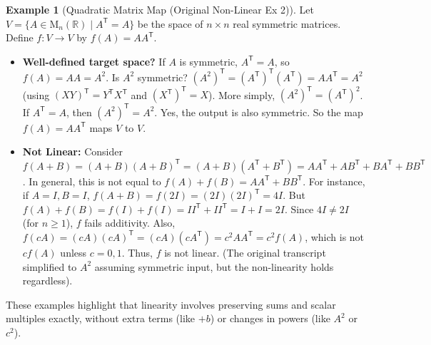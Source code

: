 \documentclass[11pt]{article}
\theoremstyle{definition}
\newtheorem{example}[theorem]{Example}
\theoremstyle{remark}
\newcommand{\R}{\mathbb{R}}
\newcommand{\Mn}[1]{\mathrm{M}_{#1}} %
\newcommand{\tr}{^\mathsf{T}} %
\begin{document}
\begin{example}[Quadratic Matrix Map (Original Non-Linear Ex 2)]
    Let $V = \{A \in \Mn{n}(\R) \mid A\tr = A\}$ be the space of $n \times n$ real symmetric matrices. Define $f: V \to V$ by $f(A) = AA\tr$.
    \begin{itemize}
        \item \textbf{Well-defined target space?} If $A$ is symmetric, $A\tr = A$, so $f(A) = AA = A^2$. Is $A^2$ symmetric? $(A^2)\tr = (A\tr)\tr (A\tr) = A A\tr = A^2$ (using $(XY)\tr=Y\tr X\tr$ and $(X\tr)\tr = X$). More simply, $(A^2)\tr = (A\tr)^2$. If $A\tr=A$, then $(A^2)\tr = A^2$. Yes, the output is also symmetric. So the map $f(A)=AA\tr$ maps $V$ to $V$.
        \item \textbf{Not Linear:} Consider $f(A+B) = (A+B)(A+B)\tr = (A+B)(A\tr+B\tr) = AA\tr + AB\tr + BA\tr + BB\tr$. In general, this is not equal to $f(A)+f(B) = AA\tr + BB\tr$. For instance, if $A=I, B=I$, $f(A+B)=f(2I)=(2I)(2I)\tr=4I$. But $f(A)+f(B)=f(I)+f(I)=II\tr+II\tr=I+I=2I$. Since $4I \neq 2I$ (for $n \ge 1$), $f$ fails additivity. Also, $f(cA) = (cA)(cA)\tr = (cA)(c A\tr) = c^2 A A\tr = c^2 f(A)$, which is not $c f(A)$ unless $c=0, 1$. Thus, $f$ is not linear. (The original transcript simplified to $A^2$ assuming symmetric input, but the non-linearity holds regardless).
    \end{itemize}
\end{example}

These examples highlight that linearity involves preserving sums and scalar multiples exactly, without extra terms (like $+b$) or changes in powers (like $A^2$ or $c^2$).
\end{document}
